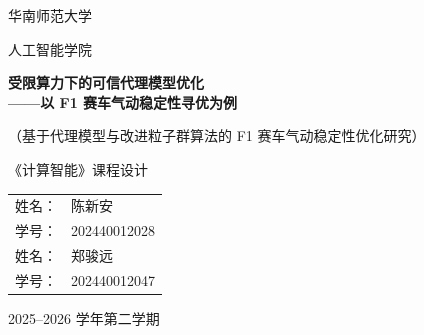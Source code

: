 \begin{titlepage}

\centering

\vspace*{2cm}

{\Huge\heiti 华南师范大学 \par}

\vspace{0.5cm}

{\Large 人工智能学院 \par}

\vspace{2.5cm}

{\Huge\bfseries
受限算力下的可信代理模型优化\\[0.4cm]
——以 F1 赛车气动稳定性寻优为例
\par}

\vspace{1.2cm}

{\large （基于代理模型与改进粒子群算法的 F1 赛车气动稳定性优化研究）\par}

\vspace{2cm}

{\Large 《计算智能》课程设计}

\vfill

\begin{tabular}{rl}
姓名： & 陈新安 \\
学号： & 202440012028 \\[0.3cm]
姓名： & 郑骏远 \\
学号： & 202440012047
\end{tabular}

\vfill

{\large
2025--2026 学年第二学期
}

\vspace{1cm}

\end{titlepage}
